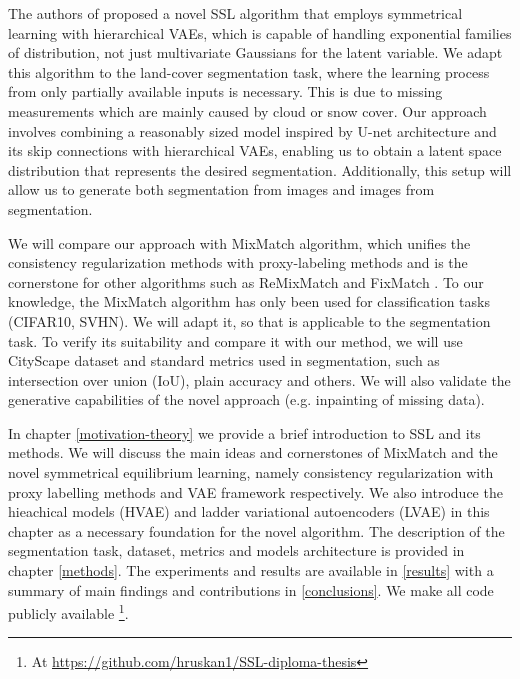 The authors of \cite{sym-learning-2023} proposed a novel SSL algorithm that employs symmetrical learning with hierarchical VAEs, which is capable of
handling exponential families of distribution, not just multivariate Gaussians for the latent variable. We adapt this algorithm to the 
land-cover segmentation task, where the learning process from only partially available inputs is necessary. This is due to missing measurements 
which are mainly caused by cloud or snow cover. 
Our approach involves combining a reasonably sized model inspired by U-net architecture and its skip connections\cite{unet-2015} with hierarchical VAEs, enabling
us to obtain a latent space distribution that represents the desired segmentation. Additionally, this setup will allow us to generate both segmentation from images 
and images from segmentation.

We will compare our approach with MixMatch \cite{mixmatch-2019} algorithm, which unifies the consistency regularization methods with proxy-labeling
methods \cite{ssl-overview-2020} and is the cornerstone for other algorithms such as ReMixMatch \cite{remixmatch-2020} and FixMatch \cite{fixmatch-2020}.
To our knowledge, the MixMatch algorithm has only been used for classification tasks (CIFAR10, SVHN). We will adapt it, so that is applicable
to the segmentation task. To verify its suitability and compare it with our method, we will use CityScape dataset and standard metrics used in 
segmentation, such as intersection over union (IoU), plain accuracy  and others. We will also validate the generative capabilities of the novel approach (e.g. 
inpainting of missing data).

In chapter \ref{motivation-theory} we provide a brief introduction to SSL and its methods.  We will discuss the main ideas 
and cornerstones of MixMatch and the novel symmetrical equilibrium learning, namely consistency regularization with proxy 
labelling methods and VAE framework respectively. 
We also introduce the hieachical models (HVAE) and ladder variational autoencoders (LVAE) in this chapter as a necessary foundation for 
the novel algorithm. The description of the segmentation task, dataset, metrics and models architecture is provided
in chapter \ref{methods}. The experiments and results are available in \ref{results} with a summary of main findings and contributions in \ref{conclusions}. 
We make all code publicly available \footnote[2]{At \url{https://github.com/hruskan1/SSL-diploma-thesis}}. 


